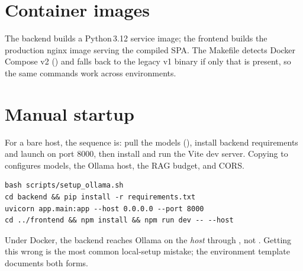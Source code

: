 \section{Container images}
The backend  builds a Python\,3.12 service image; the frontend
 builds the production nginx image serving the compiled SPA. The
Makefile detects Docker Compose v2 () and falls back to the
legacy v1 binary if only that is present, so the same commands work across
environments.

\section{Manual startup}
For a bare host, the sequence is: pull the models
(), install backend requirements and launch
 on port 8000, then install and run the Vite dev server. Copying
 to  configures models, the Ollama host, the RAG
budget, and CORS.

\begin{lstlisting}[style=bash,caption={Manual startup on a bare GPU host.}]
bash scripts/setup_ollama.sh
cd backend && pip install -r requirements.txt
uvicorn app.main:app --host 0.0.0.0 --port 8000
cd ../frontend && npm install && npm run dev -- --host
\end{lstlisting}

\begin{uawarn}
Under Docker, the backend reaches Ollama on the \emph{host} through
, not . Getting this wrong is the most
common local-setup mistake; the environment template documents both forms.
\end{uawarn}
